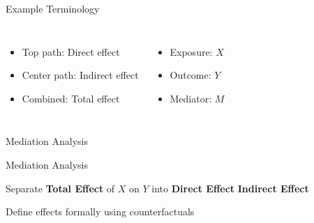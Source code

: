 \documentclass[14pt]{beamer}
\begin{document}
\begin{frame}{Example}
    Terminology
    \begin{columns}
        \begin{itemize}
            \item Top path: {Direct effect}
            \item Center path: {Indirect effect}
            \item Combined: {Total effect}
        \end{itemize}
        \begin{itemize}
            \item Exposure: $X$
            \item Outcome: $Y$
            \item Mediator: $M$
        \end{itemize}
    \end{columns}
    
\end{frame}




\begin{frame}{Mediation Analysis}
    \begin{figure}[H]
    \end{figure}
\end{frame}

\begin{frame}{Mediation Analysis}
    \begin{outline}
        \1 Separate \textbf{Total Effect} of $X$ on $Y$ into
            \2 \textbf{Direct Effect}
            \2 \textbf{Indirect Effect}\newline

        \1 Define effects formally using counterfactuals
    \end{outline}
    
\end{frame}
\end{document}
